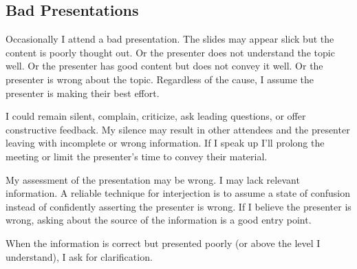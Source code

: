 \subsection*{Bad Presentations}

Occasionally I attend a bad presentation. The slides may appear slick but the content is poorly thought out. Or the presenter does not understand the topic well. Or the presenter has good content but does not convey it well. Or the presenter is wrong about the topic. Regardless of the cause, I assume the presenter is making their best effort. 

I could remain silent, complain, criticize, ask leading questions, or offer constructive feedback. My silence may result in other attendees and the presenter leaving with incomplete or wrong information. If I speak up I'll prolong the meeting or limit the presenter's time to convey their material. 

My assessment of the presentation may be wrong. I may lack relevant information. A reliable technique for interjection is to assume a state of confusion instead of confidently asserting the presenter is wrong. 
If I believe the presenter is wrong, asking about the source of the information is a good entry point.

When the information is correct but presented poorly (or above the level I understand), I ask for clarification. 